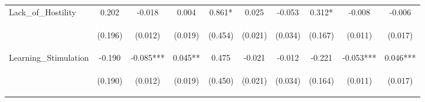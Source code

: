 \begin{tabular}{lccccccccc}
\noalign{\smallskip}Lack_of_Hostility & 0.202 & -0.018 & 0.004 & 0.861* & 0.025 & -0.053 & 0.312* & -0.008 & -0.006\\
 & \begin{footnotesize}(0.196)\end{footnotesize} & \begin{footnotesize}(0.012)\end{footnotesize} & \begin{footnotesize}(0.019)\end{footnotesize} & \begin{footnotesize}(0.454)\end{footnotesize} & \begin{footnotesize}(0.021)\end{footnotesize} & \begin{footnotesize}(0.034)\end{footnotesize} & \begin{footnotesize}(0.167)\end{footnotesize} & \begin{footnotesize}(0.011)\end{footnotesize} & \begin{footnotesize}(0.017)\end{footnotesize}\\
\noalign{\smallskip}Learning_Stimulation & -0.190 & -0.085*** & 0.045** & 0.475 & -0.021 & -0.012 & -0.221 & -0.053*** & 0.046***\\
 & \begin{footnotesize}(0.190)\end{footnotesize} & \begin{footnotesize}(0.012)\end{footnotesize} & \begin{footnotesize}(0.019)\end{footnotesize} & \begin{footnotesize}(0.450)\end{footnotesize} & \begin{footnotesize}(0.021)\end{footnotesize} & \begin{footnotesize}(0.034)\end{footnotesize} & \begin{footnotesize}(0.164)\end{footnotesize} & \begin{footnotesize}(0.011)\end{footnotesize} & \begin{footnotesize}(0.017)\end{footnotesize}\\

\end{tabular}

